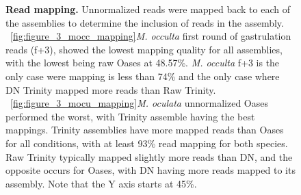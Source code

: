 \begin{figure}[!ht]
	\hfill
	\caption{\textbf{Read mapping.} Unnormalized reads were mapped back to each of the assemblies to determine the inclusion of reads in the assembly. ~\ref{fig:figure_3_mocc_mapping}\textit{M. occulta} first round of gastrulation reads (f+3), showed the lowest mapping quality for all assemblies, with the lowest being raw Oases at 48.57\%. \textit{M. occulta} f+3 is the only case were mapping is less than 74\% and the only case where DN Trinity mapped more reads than Raw Trinity. ~\ref{fig:figure_3_mocu_mapping}\textit{M. oculata} unnormalized Oases performed the worst, with Trinity assemble having the best mappings. Trinity assemblies have more mapped reads than Oases for all conditions, with at least 93\% read mapping for both species. Raw Trinity typically mapped slightly more reads than DN, and the opposite occurs for Oases, with DN having more reads mapped to its assembly.  Note that the Y axis starts at 45\%.}
	\label{fig:read_mapping}
\end{figure}


